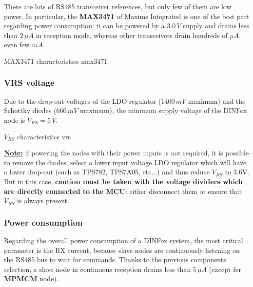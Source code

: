 There are lots of RS485 transceiver references, but only few of them are low power. In particular, the \textbf{MAX3471} of Maxims Integrated is one of the best part regarding power consumption: it can be powered by a $ 3.0\,V $ supply and drains less than $ 2\,\mu A $ in reception mode, whereas other transceivers drain hundreds of $ \mu A $, even few $ mA $. \pfs

{MAX3471 characteristics}
{max3471}

\subsubsection{VRS voltage}

Due to the drop-out voltages of the LDO regulator ($ 1400\,mV $ maximum) and the Schottky diodes ($ 660\,mV $ maximum), the minimum supply voltage of the DINFox node is $ V_{RS}=5\,V $. \pfs

{$ V_{RS} $ characteristics}
{vrs}

\textbf{\underline{Note:}} if powering the nodes with their power inputs is not required, it is possible to remove the diodes, select a lower input voltage LDO regulator which will have a lower drop-out (such as TPS782, TPS7A05, etc...) and thus reduce $ V_{RS} $ to 3.6V. But in this case, \textbf{caution must be taken with the voltage dividers which are directly connected to the MCU}: either disconnect them or ensure that $ V_{RS} $ is always present.

\subsubsection{Power consumption}

Regarding the overall power consumption of a DINFox system, the most critical parameter is the RX current, because slave nodes are continuously listening on the RS485 bus to wait for commands. Thanks to the previous components selection, a slave node in continuous reception drains less than $ 5\,\mu A $ (except for \textbf{MPMCM} node). \pfs

